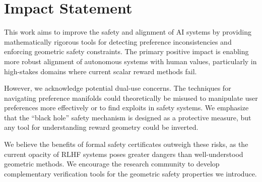 \documentclass{article}
\begin{document}
\section*{Impact Statement}
This work aims to improve the safety and alignment of AI systems by providing mathematically rigorous tools for detecting preference inconsistencies and enforcing geometric safety constraints. The primary positive impact is enabling more robust alignment of autonomous systems with human values, particularly in high-stakes domains where current scalar reward methods fail.

However, we acknowledge potential dual-use concerns. The techniques for navigating preference manifolds could theoretically be misused to manipulate user preferences more effectively or to find exploits in safety systems. We emphasize that the ``black hole'' safety mechanism is designed as a protective measure, but any tool for understanding reward geometry could be inverted.

We believe the benefits of formal safety certificates outweigh these risks, as the current opacity of RLHF systems poses greater dangers than well-understood geometric methods. We encourage the research community to develop complementary verification tools for the geometric safety properties we introduce.





\newpage
\appendix

\end{document}
